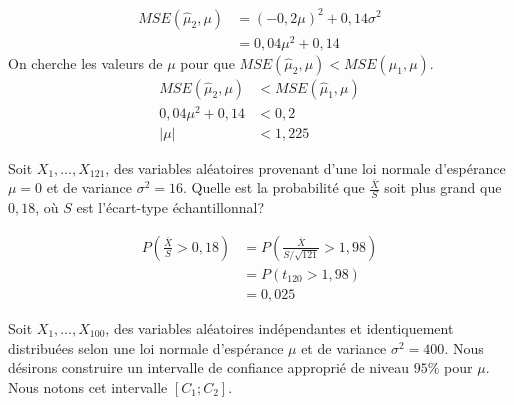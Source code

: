 \begin{questions}
\begin{parts}
\begin{solution}
                        \begin{align*}
                MSE(\hat{\mu}_2,\mu)&=(-0,2\mu)^2+0,14\sigma^2\\
                         &= 0,04\mu^2+0,14
            \end{align*}
            On cherche les valeurs de $\mu$ pour que $MSE(\hat{\mu}_2,\mu)<MSE(\hat{\mu}_1,\mu)$.
                      \begin{align*}
                MSE(\hat{\mu}_2,\mu)&<MSE(\hat{\mu}_1,\mu)\\
                0,04\mu^2+0,14&<0,2\\
                |\mu| &< 1,225
            \end{align*}
            
        \end{solution}
    \end{parts}

    \pageblanche


    \question[8] Soit $X_1,\hdots,X_{121}$, des variables aléatoires provenant d'une loi normale d'espérance $\mu=0$ et de variance $\sigma^2=16$. Quelle est la probabilité que $\displaystyle\frac{\overline{X}}{S}$ soit plus grand que $0,18$, où $S$ est l'écart-type échantillonnal?

    \begin{solution}
        \begin{align*}
            P\left(\frac{\overline{X}}{S}>0,18\right)&=P\left(\frac{\overline{X}}{S/\sqrt{121}}>1,98\right)\\
            &= P\left(t_{120}>1,98\right)\\
            &=0,025
        \end{align*}
    \end{solution}

    \pageblanche

    \question Soit $X_1,\hdots, X_{100}$, des variables aléatoires indépendantes et identiquement distribuées selon une loi normale d’espérance $\mu$ et de variance $\sigma^2 = 400$. 
Nous désirons construire un intervalle de confiance approprié de niveau $95\%$ pour $\mu$. Nous notons cet intervalle $[C_1;C_2]$.
\end{questions}
